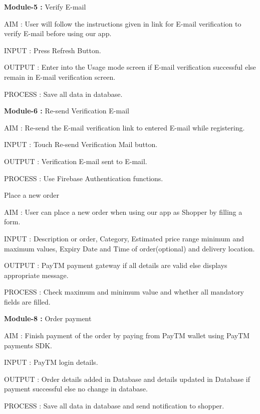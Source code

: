 \documentclass{report}
\begin{document}
\noindent \newline \textbf{Module-5 :} Verify E-mail
\begin{description}
\item AIM : User will follow the instructions given in link for E-mail verification to verify E-mail before using our app.
\item INPUT : Press Refresh Button.
\item OUTPUT : Enter into the Usage mode screen if E-mail verification successful else remain in E-mail verification screen.
\item PROCESS : Save all data in database.
\end{description}

\noindent \newline \textbf{Module-6 :} Re-send Verification E-mail
\begin{description}
\item AIM : Re-send the E-mail verification link to entered E-mail while registering.
\item INPUT : Touch Re-send Verification Mail button.
\item OUTPUT : Verification E-mail sent to E-mail.
\item PROCESS : Use Firebase Authentication functions.
\end{description}

\noindent {} Place a new order
\begin{description}
\item AIM : User can place a new order when using our app as Shopper by filling a form.
\item INPUT : Description or order, Category, Estimated price range minimum and maximum values, Expiry Date and Time of order(optional) and delivery location.
\item OUTPUT : PayTM payment gateway if all details are valid else displays appropriate message.
\item PROCESS : Check maximum and minimum value and whether all mandatory fields are filled.
\end{description}

\noindent \newline \textbf{Module-8 :} Order payment
\begin{description}
\item AIM : Finish payment of the order by paying from PayTM wallet using PayTM payments SDK.
\item INPUT : PayTM login details.
\item OUTPUT : Order details added in Database and details updated in Database if payment successful else no change in database.
\item PROCESS : Save all data in database and send notification to shopper.
\end{description}
\end{document}
